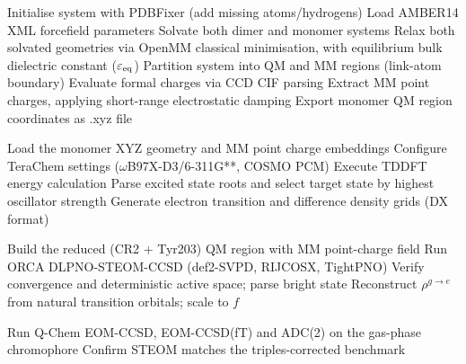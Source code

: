 \documentclass[journal=jpcbfk, manuscript=article, layout=twocolumn, doi=true]{achemso}
\begin{document}
\begin{algorithm*}[ht]
\caption{Quantum-Classical Hybrid Excitonic Coupling Pipeline \\(\texttt{reproduce\_paper.py})}
\label{alg:pipeline}
\footnotesize
\begin{algorithmic}[1]
    \State {}
    \State {}      
    \State {}      
              
        \State {} 
    \EndIf
    \State {}         
\EndProcedure

\vspace{0.2cm}
    \State Initialise system with PDBFixer (add missing atoms/hydrogens)
    \State Load AMBER14 XML forcefield parameters
    \State Solvate both dimer and monomer systems
    \State Relax both solvated geometries via OpenMM classical minimisation, with equilibrium bulk dielectric constant ($\varepsilon_{\rm eq}$)
    \State Partition system into QM and MM regions (link-atom boundary)
    \State Evaluate formal charges via CCD CIF parsing
    \State Extract MM point charges, applying short-range electrostatic damping
    \State Export monomer QM region coordinates as .xyz file
\EndProcedure

\vspace{0.2cm}
    \State Load the monomer XYZ geometry and MM point charge embeddings
    \State Configure TeraChem settings ($\omega$B97X-D3/6-311G**, COSMO PCM)
    \State Execute TDDFT energy calculation
    \State Parse excited state roots and select target state by highest oscillator strength
    \State Generate electron transition and difference density grids (DX format)
\EndProcedure

\vspace{0.2cm}
    \State Build the reduced (CR2 + Tyr203) QM region with MM point-charge field
    \State Run ORCA DLPNO-STEOM-CCSD (def2-SVPD, RIJCOSX, TightPNO)
    \State Verify convergence and deterministic active space; parse bright state
    \State Reconstruct $\rho^{g\to e}$ from natural transition orbitals; scale to $f$
\EndProcedure

\vspace{0.2cm}
 
    \State Run Q-Chem EOM-CCSD, EOM-CCSD(fT) and ADC(2) on the gas-phase chromophore
    \State Confirm STEOM matches the triples-corrected benchmark
\EndProcedure


\end{algorithmic}
\end{algorithm*}
\end{document}
